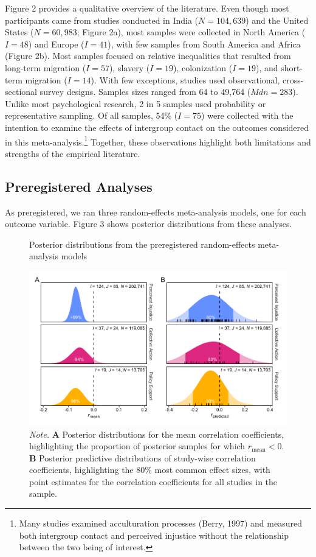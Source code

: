\documentclass[12pt, letterpaper]{article}
\begin{document}
Figure 2 provides a qualitative overview of the literature. Even though
most participants came from studies conducted in India (\(N = 104,639\))
and the United States (\(N = 60,983\); Figure 2a), most samples were
collected in North America (\(I = 48\)) and Europe (\(I = 41\)), with
few samples from South America and Africa (Figure 2b). Most samples
focused on relative inequalities that resulted from long-term migration
(\(I = 57\)), slavery (\(I = 19\)), colonization (\(I = 19\)), and
short-term migration (\(I = 14\)). With few exceptions, studies used
observational, cross-sectional survey designs. Samples sizes ranged from
64 to 49,764 (\(\textit{Mdn} = 283\)). Unlike most psychological
research, 2 in 5 samples used probability or representative sampling. Of
all samples, 54\% (\(I = 75\)) were collected with the intention to
examine the effects of intergroup contact on the outcomes considered in
this meta-analysis.\footnote{Many studies examined acculturation
  processes (Berry, 1997) and measured both intergroup contact and
  perceived injustice without the relationship between the two being of
  interest.} Together, these observations highlight both limitations and
strengths of the empirical literature.

\hypertarget{preregistered-analyses-1}{%
\subsection{Preregistered Analyses}\label{preregistered-analyses-1}}

As preregistered, we ran three random-effects meta-analysis models, one
for each outcome variable. Figure 3 shows posterior distributions from
these analyses.

\begin{figure}[t!]
\centering
\caption{Posterior distributions from the preregistered random-effects meta-analysis models}
\includegraphics[scale=1]{../figures/figure-3}
\caption*{\textit{Note.} \textbf{A} Posterior distributions for the mean correlation coefficients, highlighting the proportion of posterior samples for which $r_\text{mean} < 0$. \textbf{B} Posterior predictive distributions of study-wise correlation coefficients, highlighting the 80\% most common effect sizes, with point estimates for the correlation coefficients for all studies in the sample.}
\label{fig:f3}
\end{figure}
\end{document}

